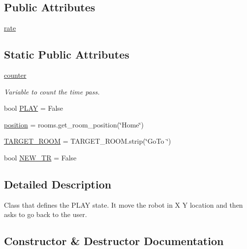 \subsection*{Public Attributes}
\begin{DoxyCompactItemize}
\item 
\hyperlink{classcm2_1_1Play_a4f8427d5a6c4eaeaa0e171879dbf6b21}{rate}
\end{DoxyCompactItemize}
\subsection*{Static Public Attributes}
\begin{DoxyCompactItemize}
\item 
\hyperlink{classcm2_1_1Play_a93ae6781b2c6899b3baaff6a1e85b993}{counter}
\begin{DoxyCompactList}\small\item\em Variable to count the time pass. \end{DoxyCompactList}\item 
bool \hyperlink{classcm2_1_1Play_a7c234a400b24301b31af0bd23d48e3f7}{P\+L\+AY} = False
\item 
\hyperlink{classcm2_1_1Play_a7d95099e35917fe5d3954cb6ba02a07d}{position} = rooms.\+get\+\_\+room\+\_\+position(\char`\"{}Home\char`\"{})
\item 
\hyperlink{classcm2_1_1Play_a04801b2166d02c4d58ad8a12ec71dafd}{T\+A\+R\+G\+E\+T\+\_\+\+R\+O\+OM} = T\+A\+R\+G\+E\+T\+\_\+\+R\+O\+O\+M.\+strip(\char`\"{}Go\+To \char`\"{})
\item 
bool \hyperlink{classcm2_1_1Play_ac55ece5d83e26bbc6d388510349c2b85}{N\+E\+W\+\_\+\+TR} = False
\end{DoxyCompactItemize}


\subsection{Detailed Description}
\begin{DoxyVerb}Class that defines the PLAY state. 
 It move the robot in X Y location and then asks to go back to the user.\end{DoxyVerb}
 

\subsection{Constructor \& Destructor Documentation}
